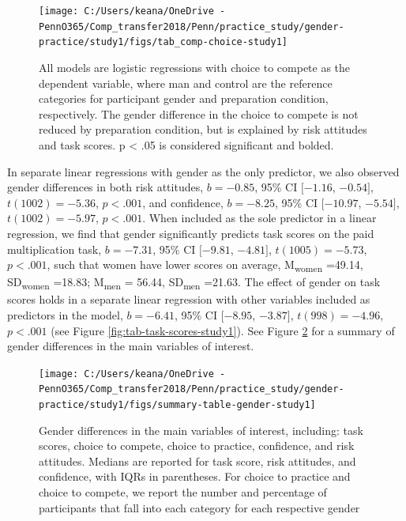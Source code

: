 \documentclass[a4paper, nobind]{templates/ociamthesis}
\begin{document}
\begin{figure}

{\centering \texttt{[image: C:/Users/keana/OneDrive - PennO365/Comp\_transfer2018/Penn/practice\_study/gender-practice/study1/figs/tab\_comp-choice-study1]} 

}

\caption{All models are logistic regressions with choice to compete as the dependent variable, where man and control are the reference categories for participant gender and preparation condition, respectively. The gender difference in the choice to compete is not reduced by preparation condition, but is explained by risk attitudes and task scores. p < .05 is considered significant and bolded.}\label{fig:tab-comp-choice-study1}
\end{figure}

In separate linear regressions with gender as the only predictor, we also observed gender differences in both risk attitudes, \(b = -0.85\), 95\% CI \([-1.16\), \(-0.54]\), \(t(1002) = -5.36\), \(p < .001\), and confidence, \(b = -8.25\), 95\% CI \([-10.97\), \(-5.54]\), \(t(1002) = -5.97\), \(p < .001\). When included as the sole predictor in a linear regression, we find that gender significantly predicts task scores on the paid multiplication task, \(b = -7.31\), 95\% CI \([-9.81\), \(-4.81]\), \(t(1005) = -5.73\), \(p < .001\), such that women have lower scores on average, M\textsubscript{women} =49.14, SD\textsubscript{women} =18.83; M\textsubscript{men} = 56.44, SD\textsubscript{men} =21.63. The effect of gender on task scores holds in a separate linear regression with other variables included as predictors in the model, \(b = -6.41\), 95\% CI \([-8.95\), \(-3.87]\), \(t(998) = -4.96\), \(p < .001\) (see Figure \ref{fig:tab-task-scores-study1}). See Figure \ref{fig:summary-table-gender-study1} for a summary of gender differences in the main variables of interest.

\begin{figure}

{\centering \texttt{[image: C:/Users/keana/OneDrive - PennO365/Comp\_transfer2018/Penn/practice\_study/gender-practice/study1/figs/summary-table-gender-study1]} 

}

\caption{Gender differences in the main variables of interest, including: task scores, choice to compete, choice to practice, confidence, and risk attitudes. Medians are reported for task score, risk attitudes, and confidence, with IQRs in parentheses. For choice to practice and choice to compete, we report the number and percentage of participants that fall into each category for each respective gender}\label{fig:summary-table-gender-study1}
\end{figure}
\end{document}
